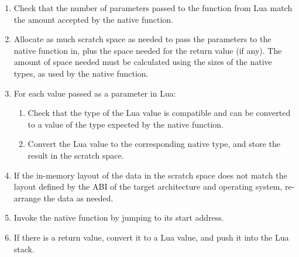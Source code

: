 \begin{enumerate}

	\item Check that the number of parameters passed to the function from Lua
	match the amount accepted by the native function.

	\item Allocate as much scratch space as needed to pass the parameters to
	the native function in, plus the space needed for the return value (if any).
	The amount of space needed must be calculated using the sizes of the native
	types, as used by the native function.

	\item For each value passed as a parameter in Lua:

		\begin{enumerate}

			\item Check that the type of the Lua value is compatible and can be
			converted to a value of the type expected by the native function.

			\item Convert the Lua value to the corresponding native type, and store
			the result in the scratch space.

		\end{enumerate}

	\item If the in-memory layout of the data in the scratch space does not
	match the layout defined by the \gls{ABI} of the target architecture and
	operating system, re-arrange the data as needed.

	\item Invoke the native function by jumping to its start address.

	\item If there is a return value, convert it to a Lua value, and push it
	into the Lua stack.

\end{enumerate}


